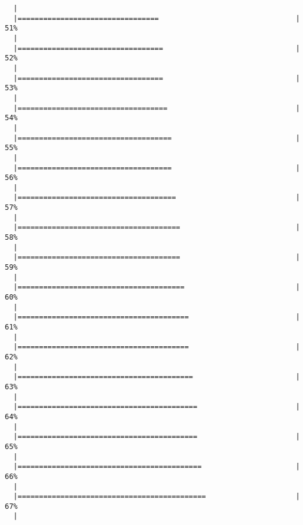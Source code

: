 \documentclass[]{article}
\begin{document}
\begin{verbatim}
  |                                                                       
  |=================================                                |  51%
  |                                                                       
  |==================================                               |  52%
  |                                                                       
  |==================================                               |  53%
  |                                                                       
  |===================================                              |  54%
  |                                                                       
  |====================================                             |  55%
  |                                                                       
  |====================================                             |  56%
  |                                                                       
  |=====================================                            |  57%
  |                                                                       
  |======================================                           |  58%
  |                                                                       
  |======================================                           |  59%
  |                                                                       
  |=======================================                          |  60%
  |                                                                       
  |========================================                         |  61%
  |                                                                       
  |========================================                         |  62%
  |                                                                       
  |=========================================                        |  63%
  |                                                                       
  |==========================================                       |  64%
  |                                                                       
  |==========================================                       |  65%
  |                                                                       
  |===========================================                      |  66%
  |                                                                       
  |============================================                     |  67%
  |                                                                       

\end{verbatim}
\end{document}
